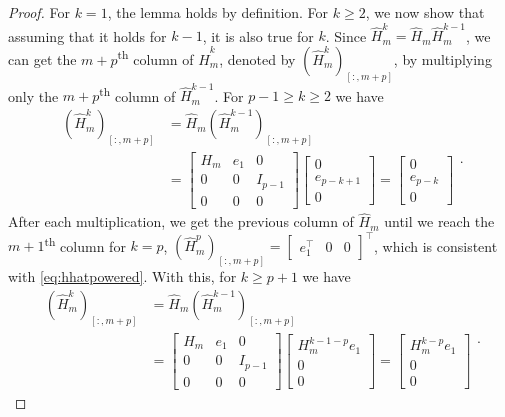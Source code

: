 \begin{proof}
    For $k=1$, the lemma holds by definition. For $k \ge 2$, we now show that assuming that it holds for $k-1$, it is also
    true for $k$. Since $\hat{H}_m^k = \hat{H}_m \hat{H}_m^{k-1}$, we can get the $m+p$\textsuperscript{th} column
    of $\hat{H}_m^k$, denoted by $(\hat{H}_m^k)_{[:, m+p]}$, by multiplying only the $m+p$\textsuperscript{th}
    column of $\hat{H}_m^{k-1}$. For $p-1 \ge k \ge 2$ we have
    \begin{equation*}
        \begin{aligned}
            (\hat{H}_m^k)_{[:, m+p]} & = \hat{H}_m (\hat{H}_m^{k-1})_{[:, m+p]} \\
            & =
            \begin{bmatrix} H_m & e_1 & 0\\ 0 & 0 & I_{p-1}\\ 0 & 0 & 0 \end{bmatrix}
            \begin{bmatrix} 0 \\ e_{p-k+1} \\ 0 \end{bmatrix}
            =
            \begin{bmatrix} 0 \\ e_{p-k} \\ 0 \end{bmatrix}
        \end{aligned}.
    \end{equation*}
    After each multiplication, we get the previous column of $\hat{H}_m$ until we reach the $m+1$\textsuperscript{th} column
    for $k=p$, $(\hat{H}_m^p)_{[:, m+p]} = \begin{bmatrix}e_1^\top & 0 & 0\end{bmatrix}^\top$, which is consistent with \eqref{eq:hhatpowered}.
    With this, for $k \ge p+1$ we have
    \begin{equation*}
        \begin{aligned}
            (\hat{H}_m^k)_{[:, m+p]} & = \hat{H}_m (\hat{H}_m^{k-1})_{[:, m+p]} \\
            & =
            \begin{bmatrix} H_m & e_1 & 0\\ 0 & 0 & I_{p-1}\\ 0 & 0 & 0 \end{bmatrix}
            \begin{bmatrix} H_m^{k-1-p} e_1 \\ 0 \\ 0 \end{bmatrix}
            =
            \begin{bmatrix} H_m^{k-p} e_1 \\ 0 \\ 0 \end{bmatrix}
        \end{aligned}.
    \end{equation*}
\end{proof}


